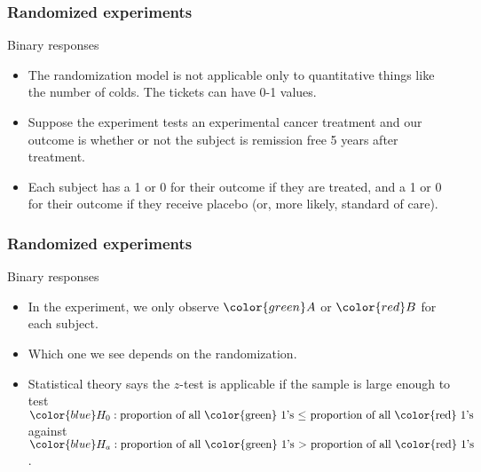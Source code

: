 \documentclass[handout]{beamer}
\begin{document}
   \begin{frame} \frametitle{Randomized experiments}

   \begin{block}
   {Binary responses}
   \begin{itemize}
   \item The randomization model is not applicable only to
   quantitative things like the number of colds. The tickets
   can have 0-1 values.

   \item Suppose the experiment tests an experimental cancer treatment
   and our outcome is whether or not the subject is remission free 5 years
   after treatment.

   \item Each subject has a {\color{green} 1 or 0} for their
   outcome if they are treated, and a {\color{red} 1 or 0} for their
   outcome if they receive placebo (or, more likely, standard of care).

   \end{itemize}
   \end{block}
   \end{frame}


   \begin{frame} \frametitle{Randomized experiments}

   \begin{block}
   {Binary responses}
   \begin{itemize}
   \item In the experiment, we only observe ${\color{green} A}$ or
   ${\color{red} B}$ for each subject.

   \item Which one we see depends on the randomization.

   \item Statistical theory says the $z$-test is applicable if the
   sample is large enough to test
   ${\color{blue} H_0: \text{proportion of all {\color{green} 1}'s $\leq$ proportion of all  {\color{red} 1}'s}}$ against
      ${\color{blue} H_a: \text{proportion of all {\color{green} 1}'s $>$ proportion of all  {\color{red} 1}'s}}$.
   \end{itemize}
   \end{block}
   \end{frame}
\end{document}
